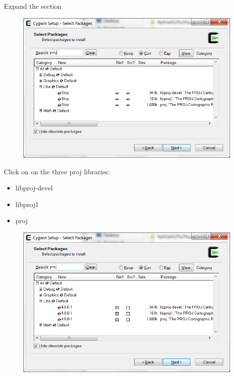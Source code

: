 Expand the section 

\begin{figure}[h]
  \includegraphics[width=\linewidth]{2015/Aug/25/proj2.png}
\end{figure}

Click on  on the three proj libraries:

\begin{itemize}
\item libproj-devel
\item libproj1
\item proj
\end{itemize}

\pagebreak

\begin{figure}[h]
  \includegraphics[width=\linewidth]{2015/Aug/25/proj3.png}
\end{figure}

